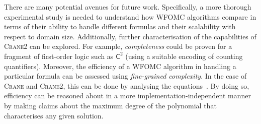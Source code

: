 \documentclass{article}
\theoremstyle{remark}
\newcommand{\Ctwo}{$\mathsf{C}^{2}$}
\newcommand{\Cranetwo}{\textsc{Crane2}}
\begin{document}
There are many potential avenues for future work. Specifically, a more thorough
experimental study is needed to understand how WFOMC algorithms compare in terms
of their ability to handle different formulas and their scalability with respect
to domain size. Additionally, further characterisation of the capabilities of
\Cranetwo{} can be explored. For example, \emph{completeness} could be proven
for a fragment of first-order logic such as \Ctwo{} (using a suitable encoding
of counting quantifiers). Moreover, the efficiency of a WFOMC algorithm in
handling a particular formula can be assessed using \emph{fine-grained
  complexity}. In the case of \textsc{Crane} and \Cranetwo{}, this can be done
by analysing the equations~\cite{DBLP:conf/kr/DilkasB23}. By doing so,
efficiency can be reasoned about in a more implementation-independent manner by
making claims about the maximum degree of the polynomial that characterises any
given solution.



\end{document}
